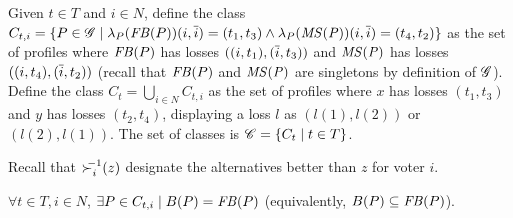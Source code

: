 \documentclass[pagesize, twoside=off, bibliography=totoc, DIV=calc, fontsize=12pt, a4paper]{scrartcl}
\begin{document}
Given $t \in T$ and $i \in N$, define the class $C_{t, i} = \set{\prof \in \fprofs \suchthat \lprof(\FBP)(i, \ibar) = (t_1, t_3) \land \lprof(\MSP)(i, \ibar) = (t_4, t_2)}$ as the set of profiles where $\mathit{FB}(P)$ has losses $((i, t_1), (\overline{i}, t_3))$ and $\mathit{MS(P)}$ has losses $((i, t_4), (\overline{i}, t_2))$ (recall that $\mathit{FB}(P)$ and $\mathit{MS(P)}$ are singletons by definition of $\mathscr{G}$). 
Define the class $C_t = \bigcup_{i \in N} C_{t, i}$ as the set of profiles where $x$ has losses $(t_1, t_3)$ and $y$ has losses $(t_2, t_4)$, displaying a loss $l$ as $(l(1), l(2))$ or $(l(2), l(1))$. 
The set of classes is $\mathscr{C} = \set{C_t \suchthat t \in T}$.

Recall that ${\succ^{\mkern-8mu -1}_i}(z)$ designate the alternatives better than $z$ for voter $i$.
\begin{conjecture}
	$\forall t \in T, i \in N$,
	$\exists \prof \in C_{t, i} \suchthat B(\prof) = \FBP$ (equivalently, $B(P) \subseteq \mathit{FB}(P)$).
\end{conjecture}
\end{document}
